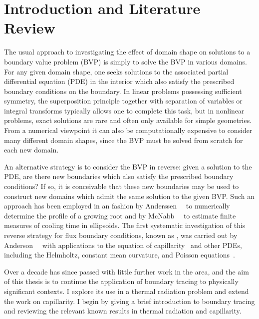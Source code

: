 \chapter{Introduction and Literature Review}
\label{ch:introduction}

The usual approach
to investigating the effect of domain shape
on solutions to a boundary value problem (BVP)
is simply to solve the BVP in various domains.
For any given domain shape, one seeks solutions
to the associated partial differential equation (PDE) in the interior
which also satisfy the prescribed boundary conditions on the boundary.
In linear problems possessing sufficient symmetry,
the superposition principle
together with separation of variables or integral transforms
typically allows one to complete this task,
but in nonlinear problems,
exact solutions are rare and often only available for simple geometries.
From a numerical viewpoint
it can also be computationally expensive
to consider many different domain shapes,
since the BVP must be solved from scratch for each new domain.

An alternative strategy is to
consider the BVP in reverse:
given a solution to the PDE\@, are there new boundaries
which also satisfy the prescribed boundary conditions?
If so, it is conceivable that these new boundaries may be used
to construct new domains
which admit the same solution to the given BVP\@.
Such an approach has been employed in an \adhoc{} fashion
by Anderssen~\etal~\cite{anderssen-1969-ion-uptake-growing-roots}
to numerically determine the profile of a growing root
and by McNabb~\etal~\cite{mcnabb-1991-theoretical-derivation-freezing-times}
to estimate finite measures of cooling time in ellipsoids.
The first systematic investigation of this
reverse strategy for flux boundary conditions,
known as ,
was carried out by
Anderson~\etal~\cite{anderson-2007-boundary-tracing-i-theory}
with applications to the \laplaceyoung{} equation
of capillarity~\cite{anderson-2006-exact-solutions-laplace-young}
and other PDEs, including the Helmholtz,
constant mean curvature, and
Poisson equations~\cite{anderson-2007-boundary-tracing-ii-applications}.

Over a decade has since passed
with little further work in the area,
and the aim of this thesis is to
continue the application of boundary tracing
to physically significant contexts.
I explore its use in a thermal radiation problem
and extend the work on capillarity.
I begin by giving a brief introduction to boundary tracing
and reviewing the relevant known results
in thermal radiation and capillarity.

